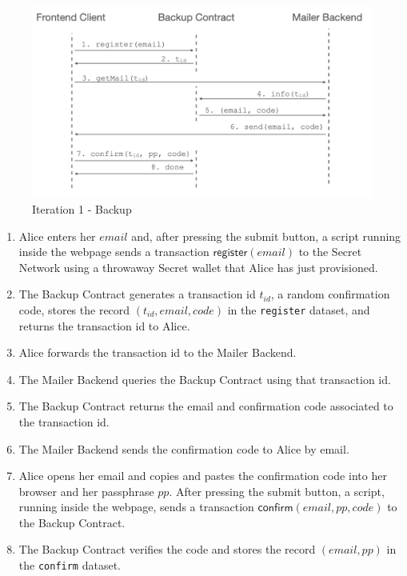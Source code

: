 \documentclass[runningheads]{llncs}
\newcommand{\ms}[1]{\ensuremath{\mathsf{#1}}}
\begin{document}
\begin{figure}[t]
  \includegraphics[width=\linewidth]{./media/media-001.png}
  \caption{Iteration 1 - Backup}
  \label{it1:backup}
\end{figure}

\begin{enumerate} 
\item Alice enters her $email$ and, after pressing the submit button, a script running inside the webpage sends a transaction {\bf $\ms{register}(email)$} to the Secret Network using a throwaway Secret wallet that Alice has just provisioned. 
\item The Backup Contract generates a transaction id $t_{id}$, a random confirmation code, stores the record $(t_{id}, email, code)$ in the {\tt register} dataset, and returns the transaction id to Alice.
\item Alice forwards the transaction id to the Mailer Backend. 
\item The Mailer Backend queries the Backup Contract using that transaction id. 
\item The Backup Contract returns the email and confirmation code associated to the transaction id. 
\item The Mailer Backend sends the confirmation code to Alice by email. 
\item Alice opens her email and copies and pastes the confirmation code into her browser and her passphrase $pp$. After pressing the submit button, a script, running inside the webpage, sends a transaction $\ms{confirm}(email, pp, code)$ to the Backup Contract. 
\item The Backup Contract verifies the code and stores the record $(email, pp)$ in the {\tt confirm} dataset. 
\end{enumerate}
\end{document}
